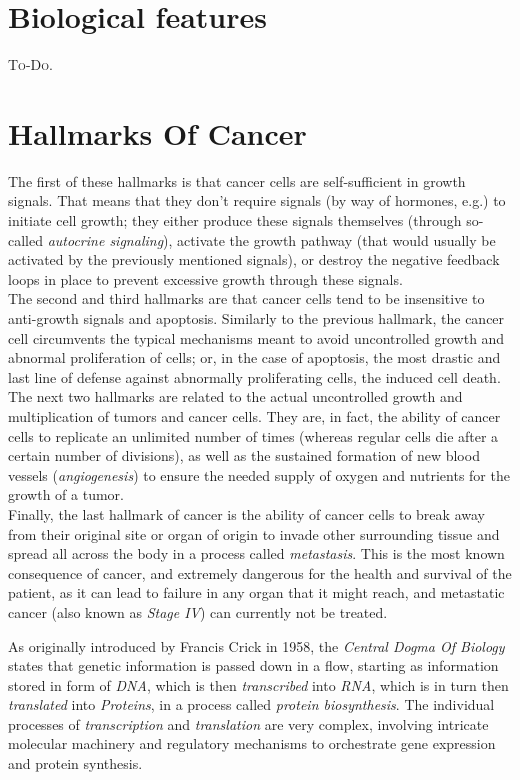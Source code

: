 \section{Biological features}
\textsc{To-Do.}

\section{Hallmarks Of Cancer}
The first of these hallmarks is that cancer cells are self-sufficient in growth signals. That means that they don't require signals (by way of hormones, e.g.) to initiate cell growth; they either produce these signals themselves (through so-called \textit{autocrine signaling}), activate the growth pathway (that would usually be activated by the previously mentioned signals), or destroy the negative feedback loops in place to prevent excessive growth through these signals.\\
The second and third hallmarks are that cancer cells tend to be insensitive to anti-growth signals and apoptosis. Similarly to the previous hallmark, the cancer cell circumvents the typical mechanisms meant to avoid uncontrolled growth and abnormal proliferation of cells; or, in the case of apoptosis, the most drastic and last line of defense against abnormally proliferating cells, the induced cell death.\\
The next two hallmarks are related to the actual uncontrolled growth and multiplication of tumors and cancer cells. They are, in fact, the ability of cancer cells to replicate an unlimited number of times (whereas regular cells die after a certain number of divisions), as well as the sustained formation of new blood vessels (\textit{angiogenesis}) to ensure the needed supply of oxygen and nutrients for the growth of a tumor.\\
Finally, the last hallmark of cancer is the ability of cancer cells to break away from their original site or organ of origin to invade other surrounding tissue and spread all across the body in a process called \textit{metastasis}. This is the most known consequence of cancer, and extremely dangerous for the health and survival of the patient, as it can lead to failure in any organ that it might reach, and metastatic cancer (also known as \textit{Stage IV}) can currently not be treated.

As originally introduced by Francis Crick in 1958, the \textit{Central Dogma Of Biology} states that genetic information is passed down in a flow, starting as information stored in form of \emph{DNA}, which is then \emph{transcribed} into \emph{RNA}, which is in turn then \emph{translated} into \emph{Proteins}, in a process called \emph{protein biosynthesis}. The individual processes of \emph{transcription} and \emph{translation} are very complex, involving intricate molecular machinery and regulatory mechanisms to orchestrate gene expression and protein synthesis.

